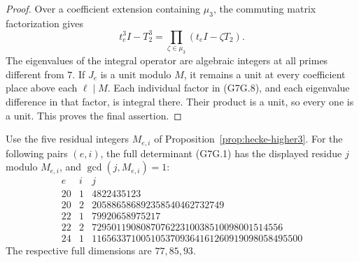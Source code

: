 \begin{proof}
Over a coefficient extension containing \(\mu_3\), the commuting
matrix factorization gives
\[
 t_e^3I-T_2^3=\prod_{\zeta\in\mu_3}(t_eI-\zeta T_2).
 \tag{G7G.8}
\]
The eigenvalues of the integral operator are algebraic integers
at all primes different from \(7\). If \(J_e\) is a unit modulo
\(M\), it remains a unit at every coefficient place above
each \(\ell\mid M\). Each individual factor in (G7G.8), and
each eigenvalue difference in that factor, is integral there.
Their product is a unit, so every one is a unit. This proves
the final assertion.
\end{proof}

\begin{proposition}
\label{prop:minus7-gl2-higher3}
Use the five residual integers \(M_{e,i}\) of
Proposition~\ref{prop:hecke-higher3}.
For the following pairs \((e,i)\), the full determinant (G7G.1)
has the displayed residue \(j\) modulo \(M_{e,i}\), and
\(\gcd(j,M_{e,i})=1\):
\[
\begin{array}{c|c|r}
e&i&j\\ \hline
20&1&4822435123\\
20&2&205886586892358540462732749\\
22&1&79920658975217\\
22&2&729501190808707622310038510098001514556\\
24&1&1165633710051053709364161260919098058495500
\end{array}
\tag{G7G.9}
\]
The respective full dimensions are \(77,85,93\).
\end{proposition}

